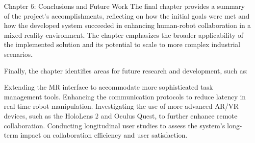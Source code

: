 Chapter 6: Conclusions and Future Work
The final chapter provides a summary of the project's accomplishments, reflecting on how the initial goals were met and how the developed system succeeded in enhancing human-robot collaboration in a mixed reality environment. The chapter emphasizes the broader applicability of the implemented solution and its potential to scale to more complex industrial scenarios.

Finally, the chapter identifies areas for future research and development, such as:

Extending the MR interface to accommodate more sophisticated task management tools.
Enhancing the communication protocols to reduce latency in real-time robot manipulation.
Investigating the use of more advanced AR/VR devices, such as the HoloLens 2 and Oculus Quest, to further enhance remote collaboration.
Conducting longitudinal user studies to assess the system’s long-term impact on collaboration efficiency and user satisfaction.
